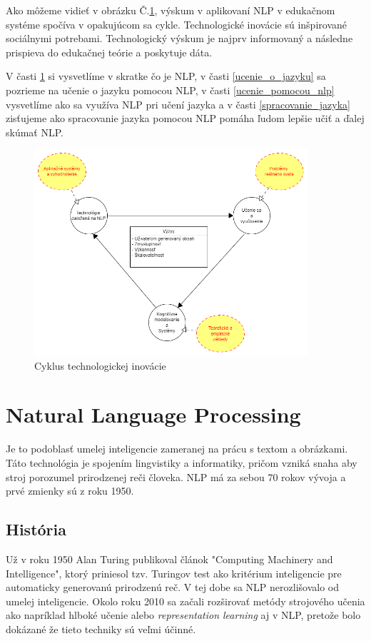 \documentclass[10pt,slovak,a4paper,twoside]{article}
\begin{document}
Ako môžeme vidieť v obrázku Č.\ref{nlp_obrazok}, výskum v aplikovaní NLP v edukačnom systéme spočíva v opakujúcom sa cykle. 
Technologické inovácie sú inšpirované sociálnymi potrebami. Technologický výskum je najprv informovaný a následne prispieva 
do edukačnej teórie a poskytuje dáta.

V časti \ref{NLP} si vysvetlíme v skratke čo je NLP, v časti \ref{ucenie_o_jazyku} sa pozrieme na učenie o jazyku pomocou NLP, 
v časti \ref{ucenie_pomocou_nlp} vysvetlíme ako sa využíva NLP pri učení jazyka a v časti \ref{spracovanie_jazyka} zisťujeme ako 
spracovanie jazyka pomocou NLP pomáha ľudom lepšie učiť a ďalej skúmať NLP.
\begin{framed}
\begin{figure}[H]\label{nlp_obrazok}
	\includegraphics[width=0.9\textwidth]{nlp}
	\centering
	\caption{Cyklus technologickej inovácie\cite{litman2016natural}}
\end{figure}
\end{framed}
\section{Natural Language Processing} \label{NLP}
Je to podoblasť umelej inteligencie zameranej na prácu s textom a obrázkami.  
Táto technológia je spojením lingvistiky a informatiky, 
pričom vzniká snaha aby stroj porozumel prirodzenej reči človeka.
NLP má za sebou 70 rokov vývoja a prvé zmienky sú z roku 1950\cite{historia}.
\subsection{História}\label{historia}
	Už v roku 1950 Alan Turing publikoval článok "Computing Machinery and Intelligence"\cite{turing2009computing}, 
	ktorý priniesol tzv. Turingov test ako kritérium inteligencie pre automaticky generovanú 
	prirodzenú reč. V tej dobe sa NLP nerozlišovalo od umelej inteligencie.\linebreak
	Okolo roku 2010 sa začali rozširovať metódy strojového učenia ako napríklad hlboké učenie alebo 
	\textit{representation learning} aj v NLP, pretože bolo dokázané že tieto techniky sú veľmi účinné.
\end{document}
